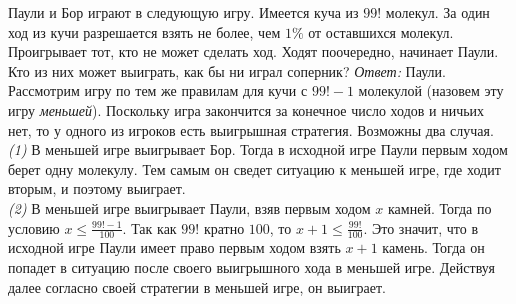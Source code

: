 \problem
Паули и Бор играют в следующую игру.
Имеется куча из $99!$ молекул.
За один ход из кучи разрешается взять не более, чем $1\%$ от оставшихся
молекул.
Проигрывает тот, кто не может сделать ход.
Ходят поочередно, начинает Паули.
Кто из них может выиграть, как бы ни играл соперник?
\solution
\emph{Ответ:} Паули.
Рассмотрим игру по тем же правилам для кучи с $99! - 1$ молекулой
(назовем эту игру \emph{меньшей}).
Поскольку игра закончится за конечное число ходов и ничьих нет, то у одного из
игроков есть выигрышная стратегия.
Возможны два случая.
\\\emph{(1)}
В меньшей игре выигрывает Бор.
Тогда в исходной игре Паули первым ходом берет одну молекулу.
Тем самым он сведет ситуацию к меньшей игре, где ходит вторым, и поэтому
выиграет.
\\\emph{(2)}
В меньшей игре выигрывает Паули, взяв первым ходом $x$ камней.
Тогда по условию $x \leq \frac{99! - 1}{100}$.
Так как $99!$ кратно $100$, то $x + 1 \leq \frac{99!}{100}$.
Это значит, что в исходной игре Паули имеет право первым ходом взять $x + 1$
камень.
Тогда он попадет в ситуацию после своего выигрышного хода в меньшей игре.
Действуя далее согласно своей стратегии в меньшей игре, он выиграет.
\endproblem
